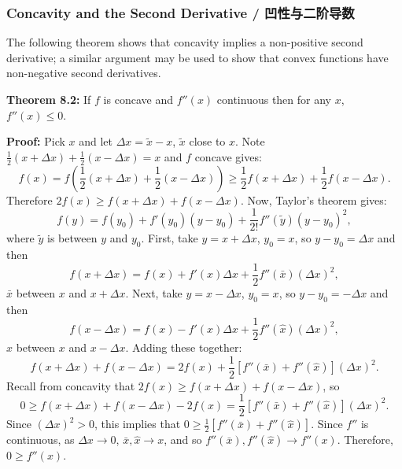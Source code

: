 \subsubsection{Concavity and the Second Derivative / 凹性与二阶导数}

\begin{original}
The following theorem shows that concavity implies a non-positive second derivative; a similar argument may be used to show that convex functions have non-negative second derivatives.

\textbf{Theorem 8.2:} If $f$ is concave and $f''(x)$ continuous then for any $x$, $f''(x) \le 0$.

\textbf{Proof:} Pick $x$ and let $\Delta x = \tilde{x} - x$, $\tilde{x}$ close to $x$. Note $\frac{1}{2}(x + \Delta x) + \frac{1}{2}(x - \Delta x) = x$ and $f$ concave gives:
\[
f(x) = f\!\left(\frac{1}{2}(x + \Delta x) + \frac{1}{2}(x - \Delta x)\right) \ge \frac{1}{2}f(x + \Delta x) + \frac{1}{2}f(x - \Delta x).
\]
Therefore $2f(x) \ge f(x + \Delta x) + f(x - \Delta x)$. Now, Taylor's theorem gives:
\[
f(y) = f(y_0) + f'(y_0)(y - y_0) + \frac{1}{2!}f''(\tilde{y})(y - y_0)^2,
\]
where $\tilde{y}$ is between $y$ and $y_0$. First, take $y = x + \Delta x$, $y_0 = x$, so $y - y_0 = \Delta x$ and then
\[
f(x + \Delta x) = f(x) + f'(x)\Delta x + \frac{1}{2}f''(\bar{x})(\Delta x)^2,
\]
$\bar{x}$ between $x$ and $x + \Delta x$. Next, take $y = x - \Delta x$, $y_0 = x$, so $y - y_0 = -\Delta x$ and then
\[
f(x - \Delta x) = f(x) - f'(x)\Delta x + \frac{1}{2}f''(\hat{x})(\Delta x)^2,
\]
$\hat{x}$ between $x$ and $x - \Delta x$. Adding these together:
\[
f(x + \Delta x) + f(x - \Delta x) = 2f(x) + \frac{1}{2}[f''(\bar{x}) + f''(\hat{x})](\Delta x)^2.
\]
Recall from concavity that $2f(x) \ge f(x + \Delta x) + f(x - \Delta x)$, so
\[
0 \ge f(x + \Delta x) + f(x - \Delta x) - 2f(x) = \frac{1}{2}[f''(\bar{x}) + f''(\hat{x})](\Delta x)^2.
\]
Since $(\Delta x)^2 > 0$, this implies that $0 \ge \frac{1}{2}[f''(\bar{x}) + f''(\hat{x})]$. Since $f''$ is continuous, as $\Delta x \to 0$, $\bar{x}, \hat{x} \to x$, and so $f''(\bar{x}), f''(\hat{x}) \to f''(x)$. Therefore, $0 \ge f''(x)$.
\end{original}
